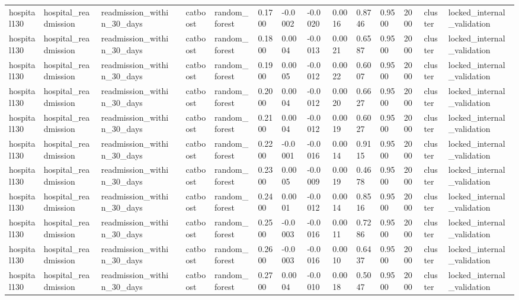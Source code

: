 \begin{tabular}{lllllllllllllll}
hospital130 & hospital\_readmission & readmission\_within\_30\_days &  & catboost & random\_forest & 0.1700 & -0.0002 & -0.0020 & 0.0016 & 0.8746 & 0.9500 & 2000 & cluster & locked\_internal\_validation \\
hospital130 & hospital\_readmission & readmission\_within\_30\_days &  & catboost & random\_forest & 0.1800 & 0.0004 & -0.0013 & 0.0021 & 0.6587 & 0.9500 & 2000 & cluster & locked\_internal\_validation \\
hospital130 & hospital\_readmission & readmission\_within\_30\_days &  & catboost & random\_forest & 0.1900 & 0.0005 & -0.0012 & 0.0022 & 0.6007 & 0.9500 & 2000 & cluster & locked\_internal\_validation \\
hospital130 & hospital\_readmission & readmission\_within\_30\_days &  & catboost & random\_forest & 0.2000 & 0.0004 & -0.0012 & 0.0020 & 0.6627 & 0.9500 & 2000 & cluster & locked\_internal\_validation \\
hospital130 & hospital\_readmission & readmission\_within\_30\_days &  & catboost & random\_forest & 0.2100 & 0.0004 & -0.0012 & 0.0019 & 0.6027 & 0.9500 & 2000 & cluster & locked\_internal\_validation \\
hospital130 & hospital\_readmission & readmission\_within\_30\_days &  & catboost & random\_forest & 0.2200 & -0.0001 & -0.0016 & 0.0014 & 0.9115 & 0.9500 & 2000 & cluster & locked\_internal\_validation \\
hospital130 & hospital\_readmission & readmission\_within\_30\_days &  & catboost & random\_forest & 0.2300 & 0.0005 & -0.0009 & 0.0019 & 0.4678 & 0.9500 & 2000 & cluster & locked\_internal\_validation \\
hospital130 & hospital\_readmission & readmission\_within\_30\_days &  & catboost & random\_forest & 0.2400 & 0.0001 & -0.0012 & 0.0014 & 0.8516 & 0.9500 & 2000 & cluster & locked\_internal\_validation \\
hospital130 & hospital\_readmission & readmission\_within\_30\_days &  & catboost & random\_forest & 0.2500 & -0.0003 & -0.0016 & 0.0011 & 0.7286 & 0.9500 & 2000 & cluster & locked\_internal\_validation \\
hospital130 & hospital\_readmission & readmission\_within\_30\_days &  & catboost & random\_forest & 0.2600 & -0.0003 & -0.0016 & 0.0010 & 0.6437 & 0.9500 & 2000 & cluster & locked\_internal\_validation \\
hospital130 & hospital\_readmission & readmission\_within\_30\_days &  & catboost & random\_forest & 0.2700 & 0.0004 & -0.0010 & 0.0018 & 0.5047 & 0.9500 & 2000 & cluster & locked\_internal\_validation \\

\end{tabular}
